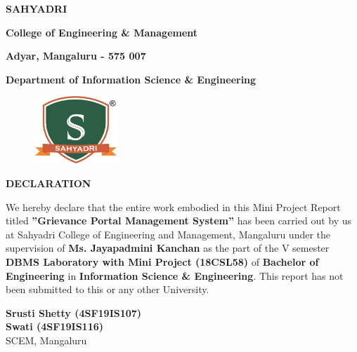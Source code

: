 \documentclass[12pt,a4paper]{report}
\begin{document}
\newpage
\begin{center}
{\LARGE \textbf{SAHYADRI}}
\par
\vspace{6pt}
{\Large \textbf{College of Engineering \& Management}}
\par
\vspace{3pt}
{\large \textbf{Adyar, Mangaluru - 575 007}}
\par
\vspace{0.25in}
{\large \textbf{Department of Information Science \& Engineering}}
\par
\begin{figure}[hbtp]
\centering
\includegraphics[width=1.25in,height=1in]{../fig/sahyadri}
\end{figure}
{\Large \textbf{DECLARATION}} 
\end{center}
\par
\vspace{0.10in}
\noindent We hereby declare that the entire work embodied in this Mini Project Report titled
\textbf{''Grievance Portal Management System''} has been carried out by us at Sahyadri College of Engineering and Management, Mangaluru under the supervision of \textbf{Ms. Jayapadmini Kanchan} as the part of the V semester \textbf{DBMS Laboratory with Mini Project (18CSL58)} of \textbf{Bachelor of Engineering} in \textbf{Information Science \& Engineering}. This report has not been submitted to this or any other University.\\
\vspace{0.25in}
\begin{flushright}
\textbf{Srusti Shetty (4SF19IS107)}\\
\textbf{Swati (4SF19IS116)}\\
SCEM, Mangaluru \\
\end{flushright}

\end{document}
